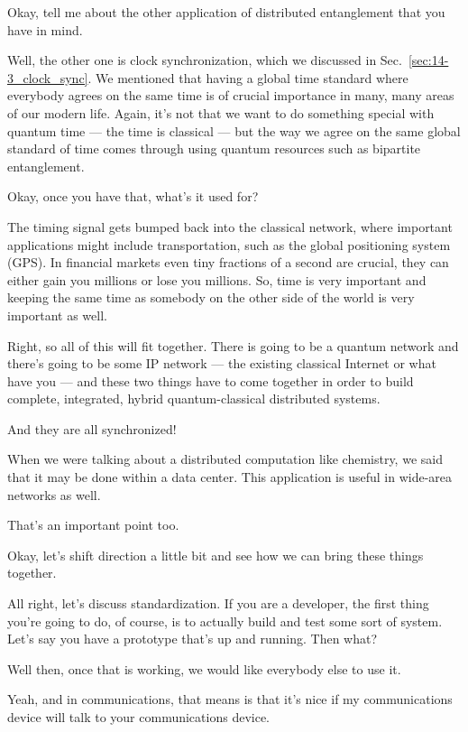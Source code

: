 \rrr Okay, tell me about the other application of distributed entanglement that you have in mind.

\mmm Well, the other one is clock synchronization, which we discussed in Sec.~\ref{sec:14-3_clock_sync}.  We mentioned that having a global time standard where everybody agrees on the same time is of crucial importance in many, many areas of our modern life. Again, it's not that we want to do something special with quantum time --- the time is classical --- but the way we agree on the same global standard of time comes through using quantum resources such as bipartite entanglement.

\rrr Okay, once you have that, what's it used for?

\mmm The timing signal gets bumped back into the classical network, where important applications might include transportation, such as the global positioning system (GPS). In financial markets even tiny fractions of a second are crucial, they can either gain you millions or lose you millions. So, time is very important and keeping the same time as somebody on the other side of the world is very important as well.

\rrr Right, so all of this will fit together. There is going to be a quantum network and there's going to be some IP network --- the existing classical Internet or what have you --- and these two things have to come together in order to build complete, integrated, hybrid quantum-classical distributed systems.

\mmm And they are all synchronized!

When we were talking about a distributed computation like chemistry, we said that it may be done within a data center. This application is useful in wide-area networks as well.

\rrr That's an important point too.

\mmm Okay, let's shift direction a little bit and see how we can bring these things together.

\rrr All right, let's discuss standardization. If you are a developer, the first thing you're going to do, of course, is to actually build and test some sort of system. Let's say you have a prototype that's up and running. Then what?

\mmm Well then, once that is working, we would like everybody else to use it.

\rrr Yeah, and in communications, that means is that it's  nice if my communications device will talk to your communications device.

